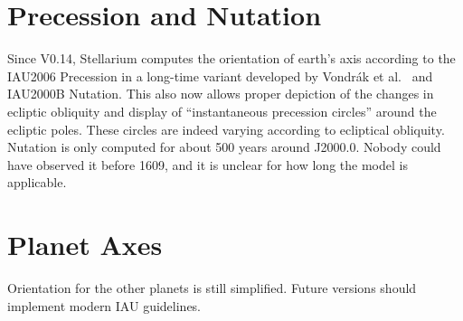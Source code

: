 \section{Precession and Nutation}
\label{sec:Accuracy:Precession}

Since V0.14, Stellarium computes the orientation of earth's axis
according to the IAU2006 Precession in a long-time variant developed
by Vondr\'ak et al.~\cite{2011AA:Vondrak} and IAU2000B Nutation. This
also now allows proper depiction of the changes in ecliptic obliquity
and display of ``instantaneous precession circles'' around the
ecliptic poles. These circles are indeed varying according to
ecliptical obliquity. Nutation is only computed for about 500 years
around J2000.0. Nobody could have observed it before 1609, and it is
unclear for how long the model is applicable.

\section{Planet Axes}
\label{sec:Accuracy:PlanetAxes}

Orientation for the other planets is still simplified. Future versions
should implement modern IAU guidelines.



